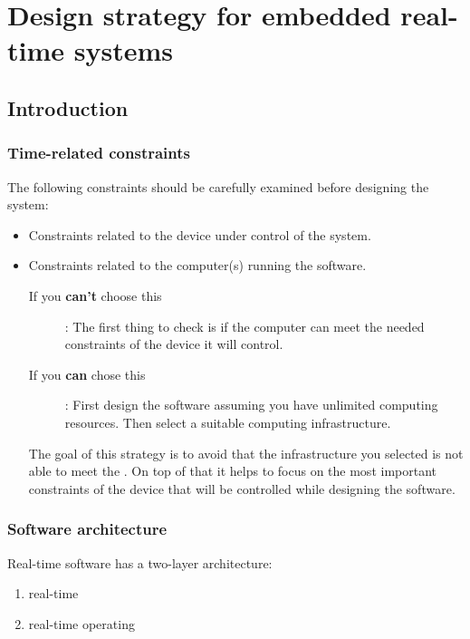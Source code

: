 

\chapter{Design strategy for embedded real-time systems}

\section{Introduction}

\subsection{Time-related constraints}
The following constraints should be carefully examined before designing the system: 
\begin{itemize}
	\item Constraints related to the device under control of the system. 
	\item Constraints related to the computer(s) running the software. 
		\begin{description}
			\item[If you \textbf{can't} choose this]: The first thing to check is if the computer can meet the needed constraints of the device it will control.
				\item[If you \textbf{can}  chose this]: First design the software assuming you have unlimited computing resources. Then select a suitable computing infrastructure.
		\end{description} 
		The goal of this strategy is to avoid that the infrastructure you selected is not able to meet the .
	On top of that it helps to focus on the most important constraints of the device that will be controlled while designing the software.
\end{itemize}




\subsection{Software architecture}
Real-time software has a two-layer architecture: 
\begin{enumerate}
	\item real-time 
	\item real-time operating 
\end{enumerate}


